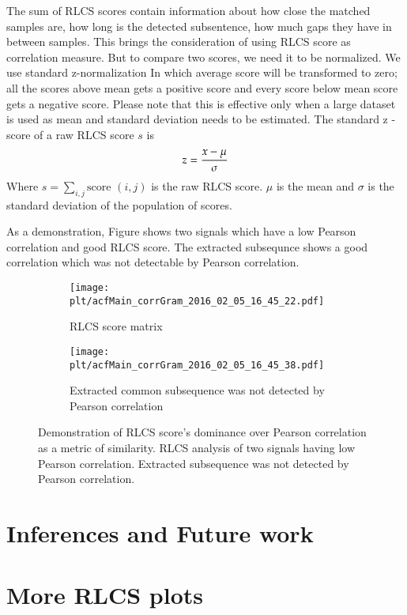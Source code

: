 \documentclass[MTech]{iitmdiss}
\newcommand{\plt}{thesis_plots}
\begin{document}
The sum of RLCS scores contain information about how close the matched samples are, how long is the detected subsentence, how much gaps they have in between samples. This brings the consideration of using RLCS score as correlation measure. But to compare two scores, we need it to be normalized. We use standard z-normalization In which average score will be transformed to zero; all the scores above mean gets a positive score and every score below mean score gets a negative score. Please note that this is effective only when a large dataset is used as mean and standard deviation needs to be estimated. The standard z - score of a raw RLCS score $s$ is
$$z = {x- \mu \over \sigma}$$
Where $s = \sum_{i, j} \text{score } (i, j)$ is the raw RLCS score.
$\mu$ is the mean and $\sigma$ is the standard deviation of the population of scores.

As a demonstration, Figure shows two signals which have a low Pearson correlation and good RLCS score. The extracted subsequnce shows a good correlation which was not detectable by Pearson correlation.
\begin{figure}[h]
  \begin{subfigure}[b]{0.5\textwidth}
    \texttt{[image: \\plt/acfMain\_corrGram\_2016\_02\_05\_16\_45\_22.pdf]}
    \caption{RLCS score matrix}
    \label{fig:ori_simple}
  \end{subfigure}%
  \begin{subfigure}[b]{0.5\textwidth}
    \texttt{[image: \\plt/acfMain\_corrGram\_2016\_02\_05\_16\_45\_38.pdf]}
    \caption{Extracted common subsequence was not detected by Pearson correlation}
    \label{fig:acfgram_diff}
  \end{subfigure}%
  \caption{Demonstration of RLCS score's dominance over Pearson correlation as a metric of similarity. RLCS analysis of two signals having low Pearson correlation. Extracted  subsequence was not detected by Pearson correlation.}
  \label{fig:oridir_simple}
\end{figure}

\chapter{Inferences and Future work}    %
\label{chap:summary}

\appendix
\chapter{More RLCS plots}
\label{chap:rlcsplots_appndx}

\pagebreak
\begin{singlespace}
  \begin{small}
	
  \end{small}
\end{singlespace}
\end{document}
